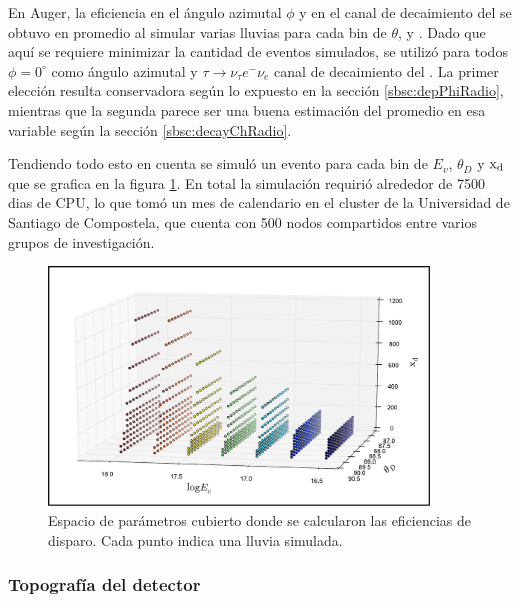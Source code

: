 	En Auger, la eficiencia en el \'angulo azimutal $\phi$ y en el canal de decaimiento del \tauon{} se obtuvo en promedio al simular varias lluvias para cada bin de $\theta$, \xd{} y \etau{}.
	Dado que aqu\'i se requiere minimizar la cantidad de eventos simulados, se utiliz\'o para todos $\phi=0^\circ$ como \'angulo azimutal y $\tau\rightarrow\nu_\tau e^-\nu_e$ canal de decaimiento del \tauon{}.
	La primer elecci\'on resulta conservadora seg\'un lo expuesto en la secci\'on \ref{sbsc:depPhiRadio}, mientras que la segunda parece ser una buena estimaci\'on del promedio en esa variable seg\'un la secci\'on \ref{sbsc:decayChRadio}.
	
	Tendiendo todo esto en cuenta se simul\'o un evento para cada bin de $E_v$, $\theta_D$ y ${\rm x_d}$ que se grafica en la figura \ref{fig:binesRadio}.
	En total la simulaci\'on requiri\'o alrededor de 7500 dias de CPU, lo que tom\'o un mes de calendario en el cluster de la Universidad de Santiago de Compostela, que cuenta con 500 nodos compartidos entre varios grupos de investigaci\'on. 
	\begin{figure}[h!]
		\begin{center}
			\includegraphics[width=0.9\textwidth]{fig/resultadosRadio/binesRadio_2}
			\caption{\label{fig:binesRadio} Espacio de par\'ametros cubierto donde se calcularon las eficiencias de disparo. Cada punto indica una lluvia simulada.
			}
		\end{center}
	\end{figure}
	
	\subsubsection{Topograf\'ia del detector}
	
